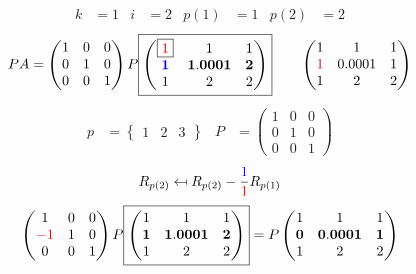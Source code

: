 \documentclass[pdf]{beamer}
\begin{document}
\begin{frame}{}\begin{align*} k &= 1 & i &= 2 & p(1) &= 1 & p(2) &= 2\end{align*} $$PA=\begin{pmatrix}1&0&0\\0&1&0\\0&0&1\end{pmatrix} P \boxed{\begin{pmatrix}\boxed{{\color{red}1}}&1&1\\\mathbf{{\color{blue}1}}&\mathbf{1.0001}&\mathbf{2}\\1&2&2\end{pmatrix}} \quad\quad \begin{pmatrix}1&1&1\\{\color{purple}1}&0.0001&1\\1&2&2\end{pmatrix}$$ \begin{align*} p&= \begin{Bmatrix}1&2&3\end{Bmatrix} & P&= \begin{pmatrix}1&0&0\\0&1&0\\0&0&1\end{pmatrix} \end{align*} $$R_{p(2)} \mapsfrom R_{p(2)} - \frac{{\color{blue}1}}{{\color{red}1}} R_{p(1)}$$ $$ \begin{pmatrix}1&0&0\\{\color{red}-1}&1&0\\0&0&1\end{pmatrix} P \boxed{\begin{pmatrix}1&1&1\\\mathbf{1}&\mathbf{1.0001}&\mathbf{2}\\1&2&2\end{pmatrix}} = P \begin{pmatrix}1&1&1\\\mathbf{0}&\mathbf{0.0001}&\mathbf{1}\\1&2&2\end{pmatrix} $$\end{frame}
\end{document}
